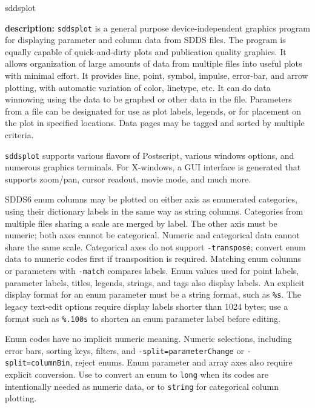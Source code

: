 \begin{sddsprog}{sddsplot}
  \item \textbf{description:}
    \verb|sddsplot| is a general purpose device-independent graphics program for displaying parameter and column data
from SDDS files.  The program is equally capable of quick-and-dirty plots and publication quality graphics.  It
allows organization of large amounts of data from multiple files into useful plots with minimal effort.  It
provides line, point, symbol, impulse, error-bar, and arrow plotting, with automatic variation of color, linetype,
etc.  It can do data winnowing using the data to be graphed or other data in the file.  Parameters from a file can
be designated for use as plot labels, legends, or for placement on the plot in specified locations.  Data pages may
be tagged and sorted by multiple criteria.

\verb|sddsplot| supports various flavors of Postscript, various windows options, and numerous graphics terminals.  For
X-windows, a GUI interface is generated that supports zoom/pan, cursor readout, movie mode, and much more.

SDDS6 enum columns may be plotted on either axis as enumerated categories, using their dictionary labels
in the same way as string columns.  Categories from multiple files sharing a scale are merged by label.
The other axis must be numeric; both axes cannot be categorical.  Numeric and categorical data cannot
share the same scale.  Categorical axes do not support \verb|-transpose|; convert enum data to numeric
codes first if transposition is required.
Matching enum columns or parameters with \verb|-match| compares labels.  Enum values used for point labels,
parameter labels, titles, legends, strings, and tags also display labels.  An explicit display format for an
enum parameter must be a string format, such as \verb|%s|.
The legacy text-edit options require display labels shorter than 1024 bytes;
use a format such as \verb|%.100s| to shorten an enum parameter label before editing.

Enum codes have no implicit numeric meaning.  Numeric selections, including error bars, sorting keys,
filters, and \verb|-split=parameterChange| or \verb|-split=columnBin|, reject enums.  Enum parameter and array
axes also require explicit conversion.  Use  to convert an enum to \verb|long| when its
codes are intentionally needed as numeric data, or to \verb|string| for categorical column plotting.


\end{sddsprog}
